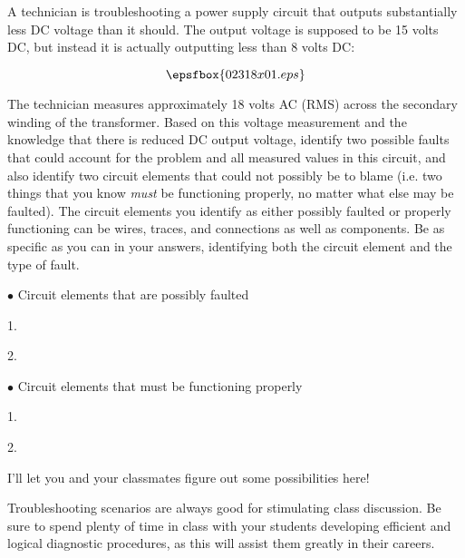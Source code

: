 

A technician is troubleshooting a power supply circuit that outputs substantially less DC voltage than it should.  The output voltage is supposed to be 15 volts DC, but instead it is actually outputting less than 8 volts DC:

$$\epsfbox{02318x01.eps}$$

The technician measures approximately 18 volts AC (RMS) across the secondary winding of the transformer.  Based on this voltage measurement and the knowledge that there is reduced DC output voltage, identify two possible faults that could account for the problem and all measured values in this circuit, and also identify two circuit elements that could not possibly be to blame (i.e. two things that you know {\it must} be functioning properly, no matter what else may be faulted).  The circuit elements you identify as either possibly faulted or properly functioning can be wires, traces, and connections as well as components.  Be as specific as you can in your answers, identifying both the circuit element and the type of fault.

\medskip
\goodbreak
\item{$\bullet$} Circuit elements that are possibly faulted
\item{1.} 
\item{2.} 
\medskip

\medskip
\goodbreak
\item{$\bullet$} Circuit elements that must be functioning properly
\item{1.} 
\item{2.} 
\medskip







I'll let you and your classmates figure out some possibilities here!







Troubleshooting scenarios are always good for stimulating class discussion.  Be sure to spend plenty of time in class with your students developing efficient and logical diagnostic procedures, as this will assist them greatly in their careers.




